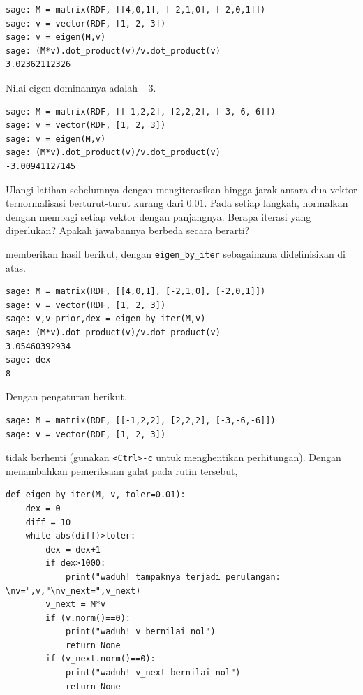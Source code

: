 \begin{exercises}
\begin{answer}
\begin{exparts}
\begin{lstlisting}
sage: M = matrix(RDF, [[4,0,1], [-2,1,0], [-2,0,1]])
sage: v = vector(RDF, [1, 2, 3])
sage: v = eigen(M,v)
sage: (M*v).dot_product(v)/v.dot_product(v)
3.02362112326
\end{lstlisting}
       \partsitem Nilai eigen dominannya adalah $-3$.
\begin{lstlisting}
sage: M = matrix(RDF, [[-1,2,2], [2,2,2], [-3,-6,-6]])
sage: v = vector(RDF, [1, 2, 3])
sage: v = eigen(M,v)
sage: (M*v).dot_product(v)/v.dot_product(v)
-3.00941127145
\end{lstlisting}
     \end{exparts}
    \end{answer}
  \item 
     Ulangi latihan sebelumnya dengan mengiterasikan hingga jarak antara dua
     vektor ternormalisasi berturut-turut kurang dari $0.01$.
     Pada setiap langkah, normalkan dengan membagi setiap vektor dengan
     panjangnya. Berapa iterasi yang diperlukan? Apakah jawabannya berbeda
     secara berarti?
     \begin{answer}
       \begin{exparts}
         \partsitem
           \Sage{} memberikan hasil berikut, dengan
           \lstinline!eigen_by_iter! sebagaimana didefinisikan di atas.
\begin{lstlisting}
sage: M = matrix(RDF, [[4,0,1], [-2,1,0], [-2,0,1]])
sage: v = vector(RDF, [1, 2, 3])
sage: v,v_prior,dex = eigen_by_iter(M,v) 
sage: (M*v).dot_product(v)/v.dot_product(v)
3.05460392934
sage: dex
8            
\end{lstlisting}
         \partsitem Dengan pengaturan berikut,
\begin{lstlisting}
sage: M = matrix(RDF, [[-1,2,2], [2,2,2], [-3,-6,-6]])
sage: v = vector(RDF, [1, 2, 3])       
\end{lstlisting}
            \Sage{} tidak berhenti (gunakan \lstinline!<Ctrl>-c! untuk
            menghentikan perhitungan). Dengan menambahkan pemeriksaan galat
            pada rutin tersebut,
\begin{lstlisting}
def eigen_by_iter(M, v, toler=0.01):
    dex = 0
    diff = 10
    while abs(diff)>toler:
        dex = dex+1
        if dex>1000:
            print("waduh! tampaknya terjadi perulangan: \nv=",v,"\nv_next=",v_next)
        v_next = M*v
        if (v.norm()==0):
            print("waduh! v bernilai nol")
            return None
        if (v_next.norm()==0):
            print("waduh! v_next bernilai nol")
            return None

\end{lstlisting}
\end{exparts}
\end{answer}
\end{exercises}
